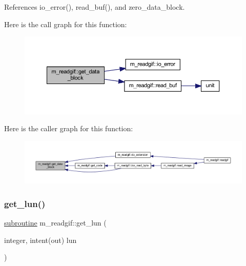 References io\+\_\+error(), read\+\_\+buf(), and zero\+\_\+data\+\_\+block.

Here is the call graph for this function\+:
\nopagebreak
\begin{figure}[H]
\begin{center}
\leavevmode
\includegraphics[width=350pt]{namespacem__readgif_ace6e51d0293107696bd1482348414a43_cgraph}
\end{center}
\end{figure}
Here is the caller graph for this function\+:
\nopagebreak
\begin{figure}[H]
\begin{center}
\leavevmode
\includegraphics[width=350pt]{namespacem__readgif_ace6e51d0293107696bd1482348414a43_icgraph}
\end{center}
\end{figure}
\mbox{\label{namespacem__readgif_a7109d632cddcb8d66729d25bbed5c33c}} 
\subsubsection{\texorpdfstring{get\+\_\+lun()}{get\_lun()}}
{\footnotesize\ttfamily \hyperlink{M__stopwatch_83_8txt_acfbcff50169d691ff02d4a123ed70482}{subroutine} m\+\_\+readgif\+::get\+\_\+lun (\begin{DoxyParamCaption}\item[{integer, intent(out)}]{lun }\end{DoxyParamCaption})\hspace{0.3cm}{\ttfamily [private]}}



